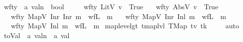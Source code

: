 \begin{isabellebody}
\ wf{\isacharunderscore}{\kern0pt}ty\ {\isacharcolon}{\kern0pt}{\isacharcolon}{\kern0pt}\ {\isachardoublequoteopen}{\isacharprime}{\kern0pt}a\ valn\ {\isasymRightarrow}\ bool{\isachardoublequoteclose}\ \isanewline
\ \ \ \ {\isachardoublequoteopen}wf{\isacharunderscore}{\kern0pt}ty\ {\isacharparenleft}{\kern0pt}LitV\ v{\isacharparenright}{\kern0pt}\ {\isacharequal}{\kern0pt}\ True{\isachardoublequoteclose}\isanewline
\ \ {\isacharbar}{\kern0pt}\ {\isachardoublequoteopen}wf{\isacharunderscore}{\kern0pt}ty\ {\isacharparenleft}{\kern0pt}AbsV\ v{\isacharparenright}{\kern0pt}\ {\isacharequal}{\kern0pt}\ True{\isachardoublequoteclose}\isanewline
\ \ {\isacharbar}{\kern0pt}\ {\isachardoublequoteopen}wf{\isacharunderscore}{\kern0pt}ty\ {\isacharparenleft}{\kern0pt}MapV\ {\isacharparenleft}{\kern0pt}Inr\ {\isacharparenleft}{\kern0pt}Inr\ m{\isacharparenright}{\kern0pt}{\isacharparenright}{\kern0pt}{\isacharparenright}{\kern0pt}\ {\isacharequal}{\kern0pt}\ wf{\isacharunderscore}{\kern0pt}L\ {}\ m{\isachardoublequoteclose}\isanewline
\ \ {\isacharbar}{\kern0pt}\ {\isachardoublequoteopen}wf{\isacharunderscore}{\kern0pt}ty\ {\isacharparenleft}{\kern0pt}MapV\ {\isacharparenleft}{\kern0pt}Inr\ {\isacharparenleft}{\kern0pt}Inl\ m{\isacharparenright}{\kern0pt}{\isacharparenright}{\kern0pt}{\isacharparenright}{\kern0pt}\ {\isacharequal}{\kern0pt}\ wf{\isacharunderscore}{\kern0pt}L\ {}\ m{\isachardoublequoteclose}\isanewline
\ \ {\isacharbar}{\kern0pt}\ {\isachardoublequoteopen}wf{\isacharunderscore}{\kern0pt}ty\ {\isacharparenleft}{\kern0pt}MapV\ {\isacharparenleft}{\kern0pt}Inl\ m{\isacharparenright}{\kern0pt}{\isacharparenright}{\kern0pt}\ {\isacharequal}{\kern0pt}\ wf{\isacharunderscore}{\kern0pt}L\ {}\ m{\isachardoublequoteclose}\isanewline
\isanewline
{}\isamarkupfalse%
\ map{\isacharunderscore}{\kern0pt}level{\isacharunderscore}{\kern0pt}gt{\isacharunderscore}{\kern0pt}{}{\isacharcolon}{\kern0pt}\ {\isachardoublequoteopen}tmap{\isacharunderscore}{\kern0pt}lvl\ {\isacharparenleft}{\kern0pt}TMap\ tv\ tk{\isacharparenright}{\kern0pt}\ {\isasymge}\ {}{\isachardoublequoteclose}%
\isadelimproof
\ %
\endisadelimproof
%
\isatagproof
{}\isamarkupfalse%
\ auto%
\endisatagproof
{\isafoldproof}%
%
\isadelimproof
%
\endisadelimproof
%
\isadelimdocument
%
\endisadelimdocument
%
\isatagdocument
%
\isamarkuptrue%
%
\endisatagdocument
{\isafolddocument}%
%
\isadelimdocument
%
\endisadelimdocument
{}\isamarkupfalse%
\ toVal{}{}{}{}\ {\isacharcolon}{\kern0pt}{\isacharcolon}{\kern0pt}\ {\isachardoublequoteopen}{\isacharprime}{\kern0pt}a\ valn\ {\isasymRightarrow}\ {\isacharprime}{\kern0pt}a\ val{}{}{}{}{\isachardoublequoteclose}\ \isanewline

\end{isabellebody}
